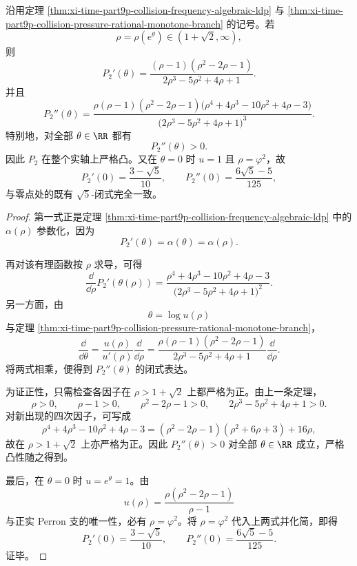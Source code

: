 \begin{theorem}[碰撞势压力的显式导数公式与全轴严格凸性]\label{thm:xi-time-part9p-collision-pressure-derivatives-global-convexity}
沿用定理 \ref{thm:xi-time-part9p-collision-frequency-algebraic-ldp} 与
\ref{thm:xi-time-part9p-collision-pressure-rational-monotone-branch} 的记号。若
\[
\rho=\rho(e^\theta)\in(1+\sqrt2,\infty),
\]
则
\[
\boxed{\;
P_2'(\theta)=
\frac{(\rho-1)(\rho^2-2\rho-1)}
{2\rho^3-5\rho^2+4\rho+1}.\;}
\]
并且
\[
\boxed{\;
P_2''(\theta)=
\frac{\rho(\rho-1)(\rho^2-2\rho-1)\bigl(\rho^4+4\rho^3-10\rho^2+4\rho-3\bigr)}
{\bigl(2\rho^3-5\rho^2+4\rho+1\bigr)^3}.\;}
\]
特别地，对全部 \(\theta\in\RR\) 都有
\[
\boxed{\;
P_2''(\theta)>0.\;}
\]
因此 \(P_2\) 在整个实轴上严格凸。又在 \(\theta=0\) 时 \(u=1\) 且 \(\rho=\varphi^2\)，故
\[
P_2'(0)=\frac{3-\sqrt5}{10},
\qquad
P_2''(0)=\frac{6\sqrt5-5}{125},
\]
与零点处的既有 \(\sqrt5\)-闭式完全一致。
\end{theorem}
\begin{proof}
第一式正是定理 \ref{thm:xi-time-part9p-collision-frequency-algebraic-ldp} 中的
\(\alpha(\rho)\) 参数化，因为
\[
P_2'(\theta)=\alpha(\theta)=\alpha(\rho).
\]

再对该有理函数按 \(\rho\) 求导，可得
\[
\frac{\dd}{\dd\rho}P_2'(\theta(\rho))
=
\frac{\rho^4+4\rho^3-10\rho^2+4\rho-3}
{\bigl(2\rho^3-5\rho^2+4\rho+1\bigr)^2}.
\]
另一方面，由
\[
\theta=\log u(\rho)
\]
与定理 \ref{thm:xi-time-part9p-collision-pressure-rational-monotone-branch}，
\[
\frac{\dd}{\dd\theta}
=
\frac{u(\rho)}{u'(\rho)}\frac{\dd}{\dd\rho}
=
\frac{\rho(\rho-1)(\rho^2-2\rho-1)}
{2\rho^3-5\rho^2+4\rho+1}\frac{\dd}{\dd\rho}.
\]
将两式相乘，便得到 \(P_2''(\theta)\) 的闭式表达。

为证正性，只需检查各因子在 \(\rho>1+\sqrt2\) 上都严格为正。由上一条定理，
\[
\rho>0,
\qquad
\rho-1>0,
\qquad
\rho^2-2\rho-1>0,
\qquad
2\rho^3-5\rho^2+4\rho+1>0.
\]
对新出现的四次因子，可写成
\[
\rho^4+4\rho^3-10\rho^2+4\rho-3
=
(\rho^2-2\rho-1)(\rho^2+6\rho+3)+16\rho,
\]
故在 \(\rho>1+\sqrt2\) 上亦严格为正。因此 \(P_2''(\theta)>0\) 对全部 \(\theta\in\RR\) 成立，严格凸性随之得到。

最后，在 \(\theta=0\) 时 \(u=e^\theta=1\)。由
\[
u(\rho)=\frac{\rho(\rho^2-2\rho-1)}{\rho-1}
\]
与正实 Perron 支的唯一性，必有 \(\rho=\varphi^2\)。将 \(\rho=\varphi^2\) 代入上两式并化简，即得
\[
P_2'(0)=\frac{3-\sqrt5}{10},
\qquad
P_2''(0)=\frac{6\sqrt5-5}{125}.
\]
证毕。
\end{proof}

